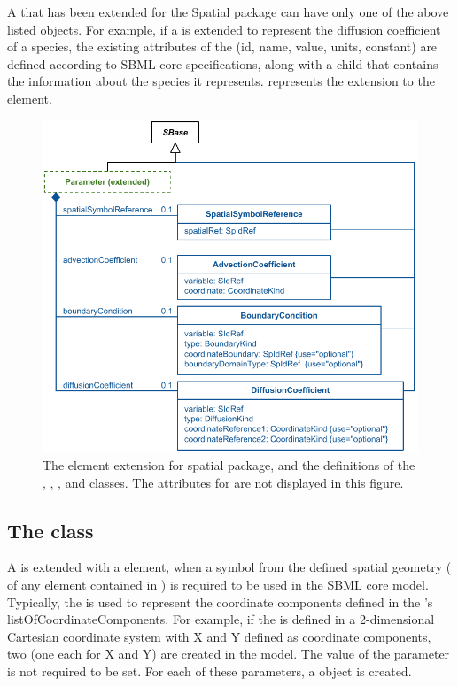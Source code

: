 A \Parameter that has been extended for the Spatial package can have only one of the above listed objects.  For example, if a \Parameter is extended to represent the diffusion coefficient of a species, the existing attributes of the \Parameter (id, name, value, units, constant) are defined according to SBML core specifications, along with a \DiffusionCoefficient child that contains the information about the species it represents.  represents the extension to the \Parameter element.

\begin{figure}[ht]
  \includegraphics{figs/extended-parameter-uml}
  \caption{The \Parameter element extension for spatial package, and the definitions of the \SpatialSymbolReference, \AdvectionCoefficient, \BoundaryCondition, and \DiffusionCoefficient classes. The \sbmlthreecore attributes for \Parameter are not displayed in this figure.}
  \label{parameter-uml}
\end{figure}



\subsection{The  class}
\label{spatialsymbolreference-class}
A \Parameter is extended with a \SpatialSymbolReference element, when a symbol from the defined spatial geometry ( of any element contained in \Geometry) is required to be used in the SBML core model. Typically, the \SpatialSymbolReference is used to represent the coordinate components defined in the \Geometry's listOfCoordinateComponents.  For example, if the \Geometry is defined in a 2-dimensional Cartesian coordinate system with X and Y defined as coordinate components, two \Parameters (one each for \CoordinateComponents X and Y) are created in the model. The value of the parameter is not required to be set. For each of these parameters, a \SpatialSymbolReference object is created.

